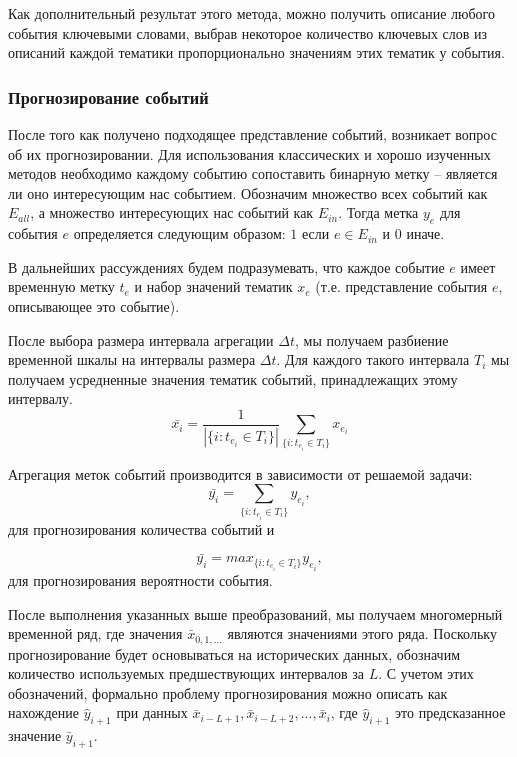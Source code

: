 Как дополнительный результат этого метода, можно получить описание любого события ключевыми словами, выбрав некоторое количество ключевых слов из описаний каждой тематики пропорционально значениям этих тематик у события.

\subsubsection{Прогнозирование событий}
\label{subsub:forecasting}
После того как получено подходящее представление событий, возникает вопрос об их прогнозировании. Для использования классических и хорошо изученных методов необходимо каждому событию сопоставить бинарную метку -- является ли оно интересующим нас событием.
Обозначим множество всех событий как  $E_{all}$, а множество интересующих нас событий как $E_{in}$. Тогда метка $y_e$ для события $e$ определяется следующим образом: $1$ если $e \in E_{in}$ и $0$ иначе.

В дальнейших рассуждениях будем подразумевать, что каждое событие $e$ имеет временную метку $t_e$ и набор значений тематик $x_e$ (т.е. представление события $e$, описывающее это событие).

После выбора размера интервала агрегации $\Delta t$, мы получаем разбиение временной шкалы на интервалы размера $\Delta t$. 
Для каждого такого интервала $T_i$ мы получаем усредненные значения тематик событий, принадлежащих этому интервалу.
$$\bar{x_i} = \frac{1}{|\{i: t_{e_i} \in T_i\}|} \sum_{\{i: t_{e_i} \in T_i\}}{x_{e_i}}$$ 

Агрегация меток событий производится в зависимости от решаемой задачи:
$$\bar{y_i} = \sum_{\{i: t_{e_i} \in T_i\}}{y_{e_i}},$$ для прогнозирования количества событий и

$$\bar{y_i} = max_{\{i: t_{e_i} \in T_i\}}{y_{e_i}}, $$ для прогнозирования вероятности события.

После выполнения указанных выше преобразований, мы получаем многомерный временной ряд, где значения $\bar{x}_{0,1,...}$ являются значениями этого ряда. 
Поскольку прогнозирование будет основываться на исторических данных, обозначим количество используемых предшествующих интервалов за $L$. С учетом этих обозначений, формально проблему прогнозирования можно описать как нахождение $\hat{y}_{i+1}$ при данных $\bar{x}_{i-L+1}, \bar{x}_{i-L+2}, ...,\bar{x}_{i}$, где $\hat{y}_{i+1}$ это предсказанное значение $\bar{y}_{i+1}$.

